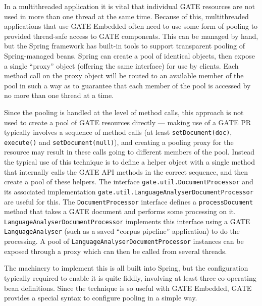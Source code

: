 
In a multithreaded application it is vital that individual GATE resources are
not used in more than one thread at the same time.  Because of this,
multithreaded applications that use GATE Embedded often need to use some form
of pooling to provided thread-safe access to GATE components.  This can be
managed by hand, but the Spring framework has built-in tools to support
transparent pooling of Spring-managed beans.  Spring can create a pool of
identical objects, then expose a single ``proxy'' object (offering the same
interface) for use by clients.  Each method call on the proxy object will be
routed to an available member of the pool in such a way as to guarantee that
each member of the pool is accessed by no more than one thread at a time.

Since the pooling is handled at the level of method calls, this approach is not
used to create a pool of GATE resources directly --- making use of a GATE PR
typically involves a sequence of method calls (at least \verb|setDocument(doc)|,
\verb|execute()| and \verb|setDocument(null)|), and creating a pooling proxy
for the resource may result in these calls going to different members of the
pool.  Instead the typical use of this technique is to define a helper object
with a single method that internally calls the GATE API methods in the correct
sequence, and then create a pool of these helpers.  The interface
\verb|gate.util.DocumentProcessor| and its associated implementation
\verb|gate.util.LanguageAnalyserDocumentProcessor| are useful for this.  The
\verb|DocumentProcessor| interface defines a \verb|processDocument| method that
takes a GATE document and performs some processing on it.
\verb|LanguageAnalyserDocumentProcessor| implements this interface using a GATE
\verb|LanguageAnalyser| (such as a saved ``corpus pipeline'' application) to do
the processing.  A pool of \verb|LanguageAnalyserDocumentProcessor| instances
can be exposed through a proxy which can then be called from several threads.

The machinery to implement this is all built into Spring, but the configuration
typically required to enable it is quite fiddly, involving at least three
co-operating bean definitions.  Since the technique is so useful with GATE
Embedded, GATE provides a special syntax to configure pooling in a simple way.

